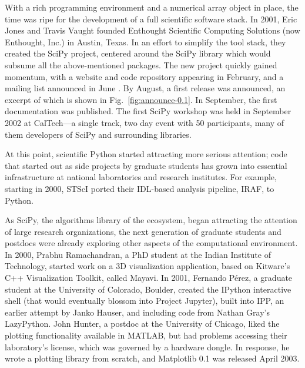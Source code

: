 \documentclass[fleqn,10pt]{wlscirep}
\begin{document}
With a rich programming environment and a numerical array object in
place, the time was ripe for the development of a full scientific
software stack.
In 2001, Eric Jones and Travis Vaught founded Enthought Scientific
Computing Solutions (now Enthought, Inc.) in Austin, Texas.  In an
effort to simplify the tool stack, they created the SciPy project,
centered around the SciPy library which would subsume all the
above-mentioned packages.
The new project quickly gained momentum, with a website and code
repository appearing in
February\cite{archived-scipyorg}, and
a mailing list announced in
June \cite{new-scipy-list}. By
August, a first release was announced\cite{first-scipy-rel}, an excerpt of which is shown in
Fig.~\ref{fig:announce-0.1}.
In September, the first documentation was
published\cite{first-scipy-docs}.
The first SciPy
workshop\cite{first-scipy-workshop}
was held in September 2002 at CalTech---a single track, two day event with 50
participants, many of them developers of SciPy and surrounding libraries.



At this point, scientific Python started attracting more serious attention;
code that started out as side projects by graduate students has grown into
essential infrastructure at national laboratories and research institutes.
For example, starting in 2000, STScI ported their IDL-based analysis pipeline,
IRAF, to Python.
 
As SciPy, the algorithms library of the ecosystem, began attracting the attention
of large research organizations,
the next generation of graduate students and postdocs were already exploring
other aspects of the computational environment.
In 2000, Prabhu Ramachandran, a PhD student at the Indian Institute of
Technology, started work on a 3D visualization application, based on
Kitware's C++ Visualization Toolkit\cite{schroeder:2006:VTK}, called
Mayavi\cite{mayavi-intro}.
In 2001, Fernando Pérez, a graduate student at the University of
Colorado, Boulder, created the IPython interactive shell (that would
eventually blossom into Project Jupyter\cite{Kluyver:2016aa}), built into
IPP, an earlier attempt by Janko Hauser, and including code from
Nathan Gray's LazyPython.
John Hunter, a postdoc
at the University
of Chicago, liked the plotting functionality
available in MATLAB, but had problems accessing their laboratory's
license, which was governed by a hardware dongle.  In response, he
wrote a plotting library from scratch, and Matplotlib 0.1 was released
April 2003\cite{matplotlib-rel}.
\end{document}

